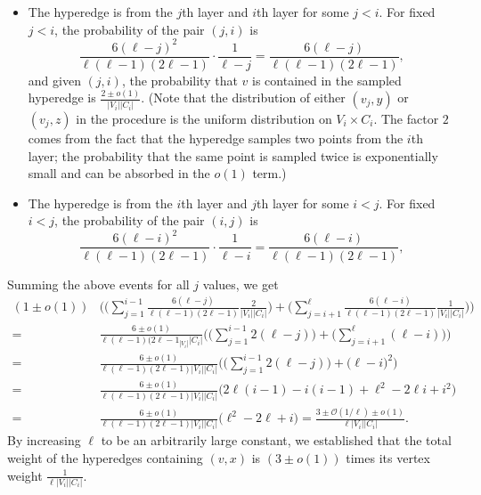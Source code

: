 \documentclass[11pt]{article}
\renewcommand{\O}[1]{\ensuremath{\mathcal{O}\left(#1\right)}}
\begin{document}
\begin{itemize}
\item The hyperedge is from the $j$th layer and $i$th layer for some $j < i$. For fixed $j < i$, the probability of the pair $(j, i)$ is 
\[
\frac{6(\ell - j)^2}{\ell (\ell-1)(2\ell - 1)} \cdot \frac{1}{\ell - j}
= \frac{6(\ell - j)}{\ell (\ell-1)(2\ell - 1)}, \]
and given $(j, i)$, the probability that $v$ is contained in the sampled hyperedge is 
$\frac{2 \pm o(1)}{|V_i||C_i|}$.
(Note that the distribution of either $(v_j, y)$ or $(v_j, z)$ in the procedure is the uniform distribution on $V_i \times C_i$. The factor $2$ comes from the fact that the hyperedge samples two points from the $i$th layer; the probability that the same point is sampled twice is exponentially small and can be absorbed in the $o(1)$ term.)

\item The hyperedge is from the $i$th layer and $j$th layer for some $i < j$. For fixed $i < j$, the probability of the pair $(i, j)$ is 
\[
\frac{6(\ell - i)^2}{\ell (\ell-1)(2\ell - 1)} \cdot \frac{1}{\ell - i}
= \frac{6(\ell - i)}{\ell (\ell-1)(2\ell - 1)}, \]
\end{itemize}
Summing the above events for all $j$ values, we get
\begin{align*}
(1 \pm o(1)) &\bigg(  \big( \sum_{j=1}^{i-1} \frac{6(\ell - j)}{\ell (\ell-1)(2\ell - 1)} 
\frac{2}{|V_i||C_i|} \big) 
+
\big( \sum_{j=i+1}^{\ell} \frac{6(\ell - i)}{\ell (\ell-1)(2\ell - 1)} 
\frac{1}{|V_i||C_i|} \big) 
\bigg)  \\
=\quad& \frac{6 \pm o(1)}{\ell (\ell-1)(2\ell - 1_ |V_i||C_i|} \bigg(  \big( \sum_{j=1}^{i-1} 2(\ell - j) \big) 
+
\big( \sum_{j=i+1}^{\ell} (\ell - i)
 \big) \bigg) \\
 =\quad& \frac{6 \pm o(1)}{\ell (\ell-1)(2\ell - 1) |V_i||C_i|} \bigg(  \big( \sum_{j=1}^{i-1} 2(\ell - j) \big) 
+ \big( \ell - i \big)^2 \bigg) \\
=\quad& \frac{6 \pm o(1)}{\ell (\ell-1)(2\ell - 1) |V_i||C_i|} \bigg( 2\ell (i - 1) - i(i-1) + \ell^2 - 2 \ell i + i^2 \bigg) \\
=\quad& \frac{6 \pm o(1)}{\ell (\ell-1)(2\ell - 1) |V_i||C_i|} \bigg( \ell^2 - 2\ell + i \bigg) = \frac{3 \pm \O{1/\ell} \pm o(1)}{\ell |V_i||C_i|}. 
\end{align*}
By increasing $\ell$ to be an arbitrarily large constant, we established that the total weight of the hyperedges containing $(v, x)$ is $(3 \pm o(1))$ times its vertex weight $\frac{1}{\ell |V_i| |C_i|}$. 
\end{document}
